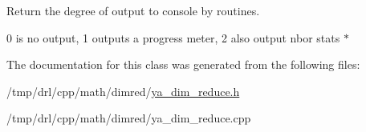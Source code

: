 Return the degree of output to console by routines. 

0 is no output, 1 outputs a progress meter, 2 also output nbor stats $\ast$ 

The documentation for this class was generated from the following files:\begin{CompactItemize}
\item 
/tmp/drl/cpp/math/dimred/\hyperlink{ya__dim__reduce_8h}{ya\_\-dim\_\-reduce.h}\item 
/tmp/drl/cpp/math/dimred/ya\_\-dim\_\-reduce.cpp\end{CompactItemize}

